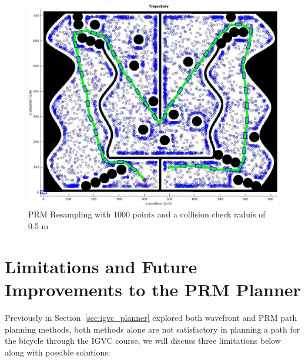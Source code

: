 \documentclass{article}
\begin{document}
\begin{figure}[H]
	\centering
	\includegraphics[width=\linewidth]{images/prm_resampling.jpg}
	\caption{PRM Resampling with 1000 points and a collision check raduis of 0.5 m}
	\label{fig:prm_resampling}
\end{figure}


\section{Limitations and Future Improvements to the PRM Planner}

Previously in Section~\ref{sec:igvc_planner}  explored both wavefront and PRM path planning methods, both methods alone are not satisfactory in planning a path for the bicycle through the IGVC course, we will discuss three limitations below along with possible solutions:
\end{document}
